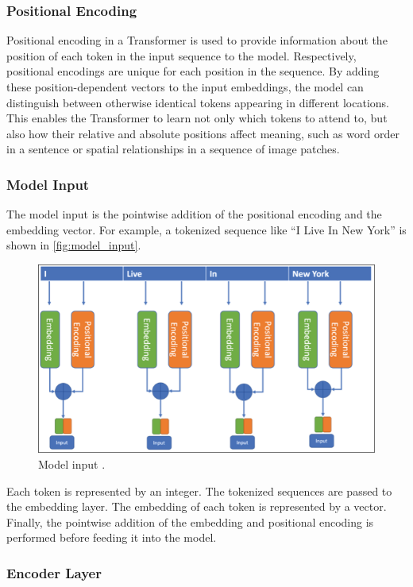 \subsubsection*{Positional Encoding}

Positional encoding in a Transformer is used to provide information about the position of each token in the input sequence to the model. Respectively, positional encodings are unique for each position in the sequence. By adding these position-dependent vectors to the input embeddings, the model can distinguish between otherwise identical tokens appearing in different locations. This enables the Transformer to learn not only which tokens to attend to, but also how their relative and absolute positions affect meaning, such as word order in a sentence or spatial relationships in a sequence of image patches.

\newpage
\subsubsection*{Model Input}

The model input is the pointwise addition of the positional encoding and the embedding vector. For example, a tokenized sequence like \enquote{I Live In New York} is shown in \autoref{fig:model_input}.

\begin{figure}[htbp]
    \centering
    \includegraphics[width=0.7\linewidth]{obrazky-figures/02-theoretical-basis/model-input.png}
    \caption{Model input \cite{timsina2024building}.}
    \label{fig:model_input}
\end{figure}

Each token is represented by an integer. The tokenized sequences are passed to the embedding layer. The embedding of each token is represented by a vector. Finally, the pointwise addition of the embedding and positional encoding is performed before feeding it into the model.

\subsubsection*{Encoder Layer}

